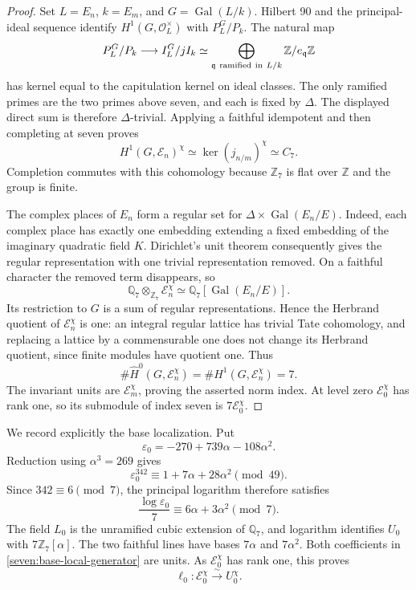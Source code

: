 \begin{proof}
Set $L=E_n$, $k=E_m$, and $G=\operatorname{Gal}(L/k)$. Hilbert 90 and
the principal-ideal sequence identify
$H^1(G,\mathcal O_L^\times)$ with $P_L^G/P_k$.
The natural map
\[
 P_L^G/P_k\longrightarrow I_L^G/jI_k
 \simeq
 \bigoplus_{\mathfrak q\ {\rm ramified\ in}\ L/k}
           \mathbb Z/e_{\mathfrak q}\mathbb Z
\]
has kernel equal to the capitulation kernel on ideal classes.
The only ramified primes are the two primes above seven, and each is
fixed by $\Delta$. The displayed direct sum is therefore
$\Delta$-trivial. Applying a faithful idempotent and then completing
at seven proves
\[
 H^1(G,\mathcal E_n)^\chi
 \simeq\ker(j_{n/m})^\chi\simeq C_7.
\]
Completion commutes with this cohomology because $\mathbb Z_7$ is flat
over $\mathbb Z$ and the group is finite.

The complex places of $E_n$ form a regular set for
$\Delta\times\operatorname{Gal}(E_n/E)$. Indeed, each complex place has
exactly one embedding extending a fixed embedding of the imaginary
quadratic field $K$. Dirichlet's unit theorem consequently gives the
regular representation with one trivial representation removed.
On a faithful character the removed term disappears, so
\[
 \mathbb Q_7\otimes_{\mathbb Z_7}\mathcal E_n^\chi
 \simeq
 \mathbb Q_7[\operatorname{Gal}(E_n/E)].
\]
Its restriction to $G$ is a sum of regular representations. Hence the
Herbrand quotient of $\mathcal E_n^\chi$ is one: an integral regular
lattice has trivial Tate cohomology, and replacing a lattice by a
commensurable one does not change its Herbrand quotient, since finite
modules have quotient one. Thus
\[
 \#\widehat H^0(G,\mathcal E_n^\chi)
 =\#H^1(G,\mathcal E_n^\chi)=7.
\]
The invariant units are $\mathcal E_m^\chi$, proving the asserted
norm index. At level zero $\mathcal E_0^\chi$ has rank one, so its
submodule of index seven is $7\mathcal E_0^\chi$.
\end{proof}

We record explicitly the base localization. Put
\[
 \varepsilon_0=-270+739\alpha-108\alpha^2.
\]
Reduction using $\alpha^3=269$ gives
\[
 \varepsilon_0^{342}
 \equiv1+7\alpha+28\alpha^2\pmod{49}.
\]
Since $342\equiv6\pmod7$, the principal logarithm therefore satisfies
\begin{equation*}\tag{U4}\label{seven:base-local-generator}
 \frac{\log\varepsilon_0}{7}
 \equiv6\alpha+3\alpha^2\pmod7.
\end{equation*}
The field $L_0$ is the unramified cubic extension of $\mathbb Q_7$,
and logarithm identifies $U_0$ with $7\mathbb Z_7[\alpha]$.
The two faithful lines have bases $7\alpha$ and $7\alpha^2$.
Both coefficients in \eqref{seven:base-local-generator} are units.
As $\mathcal E_0^\chi$ has rank one, this proves
\begin{equation*}\tag{U5}\label{seven:base-local-isomorphism}
 \ell_0:\mathcal E_0^\chi\xrightarrow{\ \sim\ }U_0^\chi.
\end{equation*}


